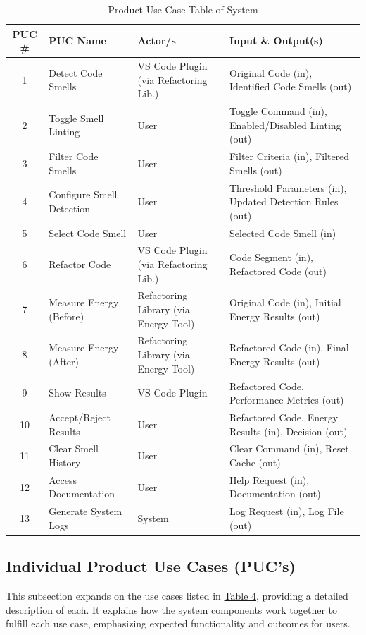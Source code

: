 \documentclass[12pt]{article}
\begin{document}
\begin{table}[H]
  \centering
  \renewcommand{\arraystretch}{0.85} 
  \begin{tabularx}{\textwidth}{|c|
      >{\raggedright\arraybackslash}X|
      >{\raggedright\arraybackslash}p{1.1in}| 
    >{\raggedright\arraybackslash}X|}
    \toprule \textbf{PUC \#} & \textbf{PUC Name} & \textbf{Actor/s} &
    \textbf{Input \& Output(s)} \\
    \midrule
    1 & Detect Code Smells & VS Code Plugin (via Refactoring Lib.) & Original Code (in), Identified Code Smells (out) \\
    2 & Toggle Smell Linting & User & Toggle Command (in), Enabled/Disabled Linting (out) \\
    3 & Filter Code Smells & User & Filter Criteria (in), Filtered Smells (out) \\
    4 & Configure Smell Detection & User & Threshold Parameters (in), Updated Detection Rules (out) \\
    5 & Select Code Smell & User & Selected Code Smell (in) \\
    6 & Refactor Code & VS Code Plugin (via Refactoring Lib.) & Code Segment (in), Refactored Code (out) \\
    7 & Measure Energy (Before) & Refactoring Library (via Energy Tool) & Original Code (in), Initial Energy Results (out) \\
    8 & Measure Energy (After) & Refactoring Library (via Energy Tool) & Refactored Code (in), Final Energy Results (out) \\
    9 & Show Results & VS Code Plugin & Refactored Code, Performance Metrics (out) \\
    10 & Accept/Reject Results & User & Refactored Code, Energy Results (in), Decision (out) \\
    11 & Clear Smell History & User & Clear Command (in), Reset Cache (out) \\
    12 & Access Documentation & User & Help Request (in), Documentation (out) \\
    13 & Generate System Logs & System & Log Request (in), Log File (out) \\
    \bottomrule
  \end{tabularx}
  \caption{Product Use Case Table of System}
  \label{tab:puc}
  \vspace{-2mm} 
\end{table}

\subsection{Individual Product Use Cases (PUC's)}
This subsection expands on the use cases listed in
\hyperref[tab:puc]{Table 4}, providing a detailed description of
each. It explains how the system components work together to fulfill
each use case, emphasizing expected functionality and outcomes for users.
\end{document}
